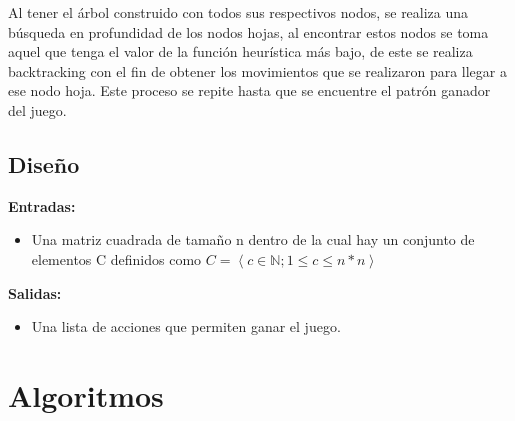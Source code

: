\documentclass[a4paper]{article}
\theoremstyle{plain}
\theoremstyle{definition}
\begin{document}
	    Al tener el árbol construido con todos sus respectivos nodos, se realiza una búsqueda en profundidad de los nodos hojas, al encontrar estos nodos se toma aquel que tenga el valor de la función heurística más bajo, de este se realiza backtracking con el fin de obtener los movimientos que se realizaron para llegar a ese nodo hoja. Este proceso se repite hasta que se encuentre el patrón ganador del juego.\newline
	    
	    \subsection{Diseño}
	    \hspace{1cm}
	    \begin{outline}[enumerate]
	
	    \1 \textbf{Entradas:}
	    	
	        \begin{itemize}
	            \item Una matriz cuadrada de tamaño n dentro de la cual hay un conjunto de elementos C definidos como $C =\left\langle c \in \mathbb{N};1 \le c \le n*n \right\rangle$
	    
	        \end{itemize}
	
	    
	    \1 \textbf{Salidas:} 
	       
	        \begin{itemize}
	            \item Una lista de acciones que permiten ganar el juego.
	            
	        \end{itemize}
	        
	     \end{outline}
	
	\section{Algoritmos}
	    
\end{document}

